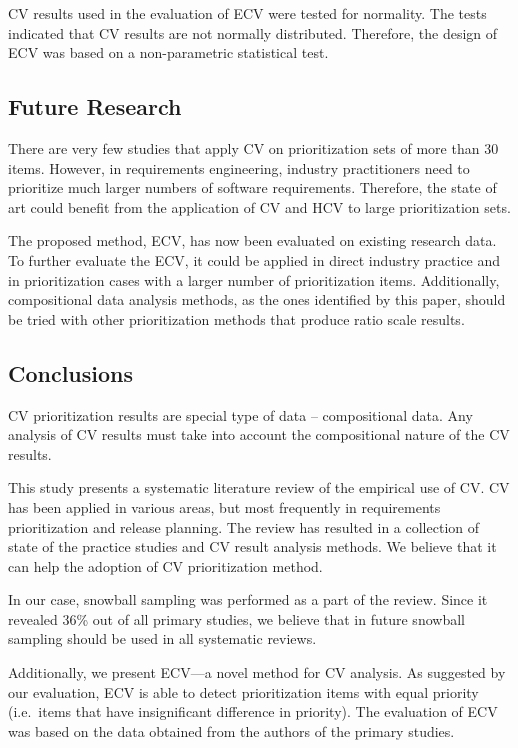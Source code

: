 CV results used in the evaluation of ECV were tested for normality.
The tests indicated that CV results are not normally distributed.
Therefore, the design of ECV was based on a non-parametric statistical test.

\subsection{Future Research}
There are very few studies that apply CV on prioritization sets of more than 30 items.
However, in requirements engineering, industry practitioners need to prioritize much larger numbers of software requirements.
Therefore, the state of art could benefit from the application of CV and HCV to large prioritization sets.

The proposed method, ECV, has now been evaluated on existing research data. To further evaluate the ECV, it could be applied in direct industry practice and in prioritization cases with a larger number of prioritization items.
Additionally, compositional data analysis methods, as the ones identified by this paper, should be tried with other prioritization methods that produce ratio scale results.

\subsection{Conclusions}
CV prioritization results are special type of data -- compositional data.
Any analysis of CV results must take into account the compositional nature of the CV results.

This study presents a systematic literature review of the empirical use of CV.
CV has been applied in various areas, but most frequently in requirements prioritization and release planning.
The review has resulted in a collection of state of the practice studies and CV result analysis methods.
We believe that it can help the adoption of CV prioritization method.

In our case, snowball sampling was performed as a part of the review.
Since it revealed 36\% out of all primary studies, 
we believe that in future snowball sampling should be used in all systematic reviews.

Additionally, we present ECV---a novel method for CV analysis.
As suggested by our evaluation, ECV is able to detect prioritization items with equal priority (i.e.\ items that have insignificant difference in priority).
The evaluation of ECV was based on the data obtained from the authors of the primary studies.